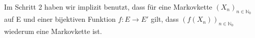 Im Schritt 2 haben wir implizit benutzt, dass für eine Markovkette $(X_{n})_{n \in \mathbb{N}_{0}}$ auf E und einer bijektiven Funktion $f:E \to E'$ gilt, dass $ (f(X_{n}))_{n \in \mathbb{N}_{0}} $ wiederum eine Markovkette ist.